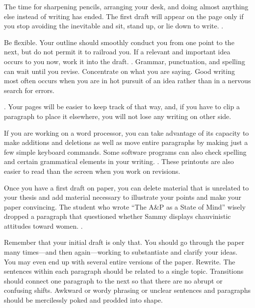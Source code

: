 \TiGanSpace


The time for sharpening pencils, arranging your desk, and doing almost
anything else instead of writing has ended. The first draft will appear
on the page only if you stop avoiding the inevitable and sit, stand up,
or lie down to write. \linefill.

Be flexible. Your outline should smoothly conduct you from one point to
the next, but do not permit it to railroad you. If a relevant and
important idea occurs to you now, work it into the draft. \linefill. Grammar, punctuation, and spelling can
wait until you revise. Concentrate on what you are saying. Good writing
most often occurs when you are in hot pursuit of an idea rather than in
a nervous search for errors.

\linefill. Your pages will be easier to keep
track of that way, and, if you have to clip a paragraph to place it
elsewhere, you will not lose any writing on other side.

If you are working on a word processor, you can take advantage of its
capacity to make additions and deletions as well as move entire
paragraphs by making just a few simple keyboard commands. Some software
programs can also check spelling and certain grammatical elements in
your writing. \linefill. These printouts are
also easier to read than the screen when you work on revisions.

Once you have a first draft on paper, you can delete material that is
unrelated to your thesis and add material necessary to illustrate your
points and make your paper convincing. The student who wrote ``The A\&P
as a State of Mind'' wisely dropped a paragraph that questioned whether
Sammy displays chauvinistic attitudes toward women. \linefill.

Remember that your initial draft is only that. You should go through the
paper many times---and then again---working to substantiate and clarify
your ideas. You may even end up with several entire versions of the
paper. Rewrite. The sentences within each paragraph should be related to
a single topic. Transitions should connect one paragraph to the next so
that there are no abrupt or confusing shifts. Awkward or wordy phrasing
or unclear sentences and paragraphs should be mercilessly poked and
prodded into shape.



